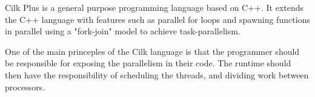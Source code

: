 Cilk Plus is a general purpose programming language based on C++. It extends the C++ language with features such as
parallel for loops and spawning functions in parallel using a "fork-join" model to achieve task-parallelism.

One of the main princeples of the Cilk language is that the programmer should be responsible for exposing the parallelism
in their code. The runtime should then have the responsibility of scheduling the threads, and dividing work between
processors. 


